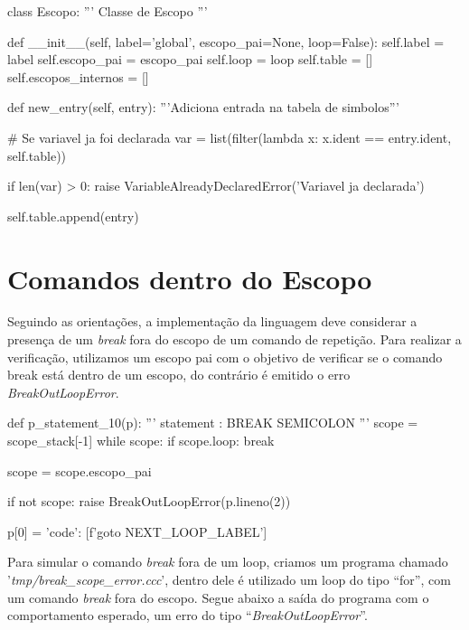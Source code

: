 \documentclass[
	12pt,				%
	openright,			%
	twoside,			%
	a4paper,			%
	english,			%
	french,				%
	spanish,			%
	brazil				%
	]{abntex2}
\begin{document}
\begin{python}
class Escopo:
    ''' Classe de Escopo '''

    def __init__(self, label='global', escopo_pai=None, loop=False):
        self.label = label
        self.escopo_pai = escopo_pai
        self.loop = loop
        self.table = []
        self.escopos_internos = []

    def new_entry(self, entry):
        '''Adiciona entrada na tabela de simbolos'''

        # Se variavel ja foi declarada
        var = list(filter(lambda x: x.ident == entry.ident, self.table))

        if len(var) > 0:
            raise VariableAlreadyDeclaredError('Variavel ja declarada')

        self.table.append(entry)
\end{python}

\section{Comandos dentro do Escopo}
Seguindo as orientações, a implementação da linguagem deve considerar a presença de um \emph{break} fora
do escopo de um comando de repetição. Para realizar a verificação, utilizamos um escopo pai com
o objetivo de verificar se o comando break está dentro de um escopo, do contrário
é emitido o erro \emph{BreakOutLoopError}.

\begin{python}
def p_statement_10(p):
    '''
    statement : BREAK SEMICOLON
    '''
    scope = scope_stack[-1]
    while scope:
        if scope.loop:
            break

        scope = scope.escopo_pai

    if not scope:
        raise BreakOutLoopError(p.lineno(2))

    p[0] = { 'code': [f'goto {NEXT_LOOP_LABEL}'] }

\end{python}
Para simular o comando \emph{break} fora de um loop, criamos um
programa chamado '\emph{tmp/break\_scope\_error.ccc}',
dentro dele é utilizado um loop do tipo ``for'', com um comando \emph{break} fora do escopo.
Segue abaixo a saída do programa com o comportamento esperado, um
erro do tipo ``\emph{BreakOutLoopError}''.
\end{document}
